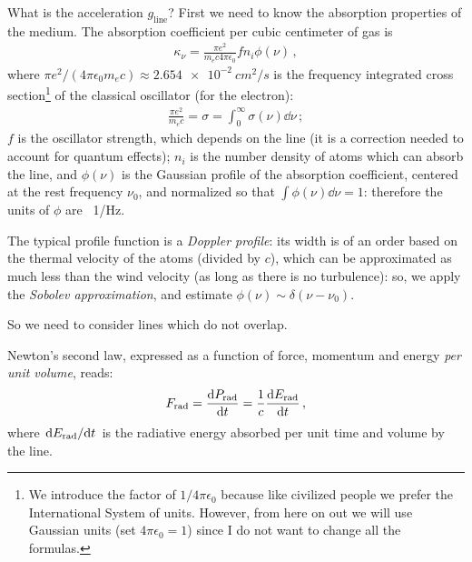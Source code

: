 \documentclass[main.tex]{subfiles}
\begin{document}
What is the acceleration \(g _{\text{line}}\)?
First we need to know the absorption properties of the medium. 
The absorption coefficient per cubic centimeter of gas is 
%
\begin{align} \label{eq:opacity-expression}
  \kappa_{\nu } = \frac{\pi e^2}{m_e c 4 \pi \epsilon_0} f n_i \phi (\nu )
\,,
\end{align}
%
where \(\pi e^2/ (4 \pi \epsilon_0 m_e c) \approx \SI{2.654e-2}{cm^2/s}\) is the frequency integrated cross section\footnote{We introduce the factor of \(1/4 \pi \epsilon_0 \) because like civilized people we prefer the International System of units. However, from here on out we will use Gaussian units (set \(4 \pi \epsilon_0 =1\)) since I do not want to change all the formulas.} of the classical oscillator (for the electron):
%
\begin{align}
  \frac{\pi e^2}{m_e c} = \sigma = \int_0^{\infty} \sigma (\nu ) \dd{\nu }
\,;
\end{align}
%
\(f\) is the oscillator strength, which depends on the line (it is a correction needed to account for quantum effects);
\(n_i\) is the number density of atoms which can absorb the line, and \(\phi (\nu )\) is the Gaussian profile of the absorption coefficient, centered at the rest frequency \(\nu_0 \), and normalized so that \(\int \phi (\nu ) \dd{\nu } = 1\): therefore the units of \(\phi\) are \SI{}{1/Hz}.


The typical profile function is a \emph{Doppler profile}: its width is of an order based on the thermal velocity of the atoms (divided by \(c\)), which can be approximated as much less than the wind velocity (as long as there is no turbulence): so, we apply the \emph{Sobolev approximation}, and estimate \(\phi (\nu ) \sim \delta (\nu - \nu_0 )\). 

So we need to consider lines which do not overlap. 

Newton's second law, expressed as a function of force, momentum and energy \emph{per unit volume}, reads: 
%
\begin{align}
  F _{\text{rad}} = \dv{P _{\text{rad}}}{t} 
  = \frac{1}{c} \dv{E _{\text{rad}}}{t}
\,,
\end{align}
%
where \(\dv*{E _{\text{rad}}}{t}\) is the radiative energy absorbed per unit time and volume by the line.
\end{document}
